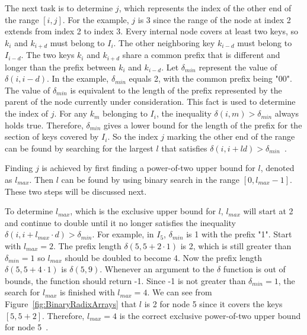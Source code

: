 \documentclass{sig-alternate}
\begin{document}
The next task is to determine $j$, which represents the index of the other end of the range $[i,j]$. For the example, $j$ is 3 since the range of the node at index 2 extends from index 2 to index 3. Every internal node covers at least two keys, so $k_i$ and $k_{i+d}$ must belong to $I_i$. The other neighboring key $k_{i-d}$ must belong to $I_{i-d}$. The two keys $k_i$ and $k_{i+d}$ share a common prefix that is different and longer than the prefix between $k_i$ and $k_{i-d}$. Let $\delta_{min}$ represent the value of $\delta(i, i-d)$. In the example, $\delta_{min}$ equals 2, with the common prefix being "00". The value of $\delta_{min}$ is equivalent to the length of the prefix represented by the parent of the node currently under consideration. This fact is used to determine the index of $j$. For any $k_m$ belonging to $I_i$, the inequality $\delta(i,m)>\delta_{min}$ always holds true. Therefore, $\delta_{min}$ gives a lower bound for the length of the prefix for the section of keys covered by $I_i$. So the index $j$ marking the other end of the range can be found by searching for the largest $l$ that satisfies $\delta(i, i+ld)>\delta_{min}$~\cite{Karras:2012}.

Finding $j$ is achieved by first finding a power-of-two upper bound for $l$, denoted as $l_{max}$. Then $l$ can be found by using binary search in the range $[0,l_{max}-1]$. These two steps will be discussed next.

To determine $l_{max}$, which is the exclusive upper bound for $l$, $l_{max}$ will start at 2 and continue to double until it no longer satisfies the inequality $\delta(i,i+l_{max} \cdot d)>\delta_{min}$. For example, in $I_5$, $\delta_{min}$ is 1 with the prefix "1". Start with $l_{max}=2$. The prefix length $\delta(5, 5+2 \cdot 1)$ is 2, which is still greater than $\delta_{min}=1$ so $l_{max}$ should be doubled to become 4. Now the prefix length $\delta(5, 5+4 \cdot 1)$ is $\delta(5,9)$. Whenever an argument to the $\delta$ function is out of bounds, the function should return -1. Since -1 is not greater than $\delta_{min}=1$, the search for $l_{max}$ is finished with $l_{max}=4$. We can see from Figure~\ref{fig:BinaryRadixArrays} that $l$ is 2 for node 5 since it covers the keys $[5,5+2]$. Therefore, $l_{max}=4$ is the correct exclusive power-of-two upper bound for node 5~\cite{Karras:2012}.
\end{document}

